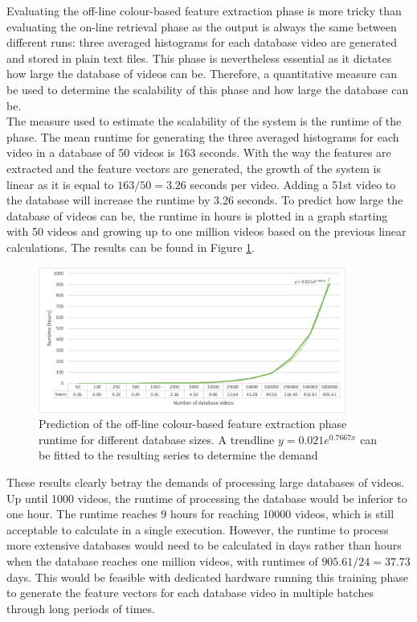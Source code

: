Evaluating the off-line colour-based feature extraction phase is more tricky than evaluating the on-line retrieval phase as the output is always the same between different runs: three averaged histograms for each database video are generated and stored in plain text files. This phase is nevertheless essential as it dictates how large the database of videos can be. Therefore, a quantitative measure can be used to determine the scalability of this phase and how large the database can be.\\

The measure used to estimate the scalability of the system is the runtime of the phase. The mean runtime for generating the three averaged histograms for each video in a database of 50 videos is 163 seconds. With the way the features are extracted and the feature vectors are generated, the growth of the system is linear as it is equal to $163/50=3.26$ seconds per video. Adding a 51st video to the database will increase the runtime by 3.26 seconds. To predict how large the database of videos can be, the runtime in hours is plotted in a graph starting with 50 videos and growing up to one million videos based on the previous linear calculations. The results can be found in Figure \ref{fig:evaluation-offline_phase_runtime_trendline}.\\

\begin{figure}[h]
\centerline{\includegraphics[width=0.9\textwidth]{figures/evaluation/offline_phase_runtime_trendline.png}}
\caption{\label{fig:evaluation-offline_phase_runtime_trendline}Prediction of the off-line colour-based feature extraction phase runtime for different database sizes. A trendline $y=0.021e^{0.7667x}$ can be fitted to the resulting series to determine the demand }
\end{figure}

These results clearly betray the demands of processing large databases of videos. Up until 1000 videos, the runtime of processing the database would be inferior to one hour. The runtime reaches 9 hours for reaching 10000 videos, which is still acceptable to calculate in a single execution. However, the runtime to process more extensive databases would need to be calculated in days rather than hours when the database reaches one million videos, with runtimes of $905.61/24=37.73$ days. This would be feasible with dedicated hardware running this training phase to generate the feature vectors for each database video in multiple batches through long periods of times.\\

